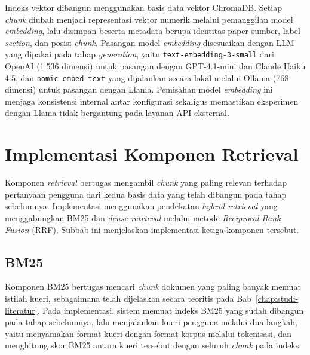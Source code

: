 Indeks vektor dibangun menggunakan basis data vektor ChromaDB. Setiap \textit{chunk} diubah menjadi representasi vektor numerik melalui pemanggilan model \textit{embedding}, lalu disimpan beserta metadata berupa identitas paper sumber, label \textit{section}, dan posisi \textit{chunk}. Pasangan model \textit{embedding} disesuaikan dengan LLM yang dipakai pada tahap \textit{generation}, yaitu \texttt{text-embedding-3-small} dari OpenAI (1.536 dimensi) untuk pasangan dengan GPT-4.1-mini dan Claude Haiku 4.5, dan \texttt{nomic-embed-text} yang dijalankan secara lokal melalui Ollama (768 dimensi) untuk pasangan dengan Llama. Pemisahan model \textit{embedding} ini menjaga konsistensi internal antar konfigurasi sekaligus memastikan eksperimen dengan Llama tidak bergantung pada layanan API eksternal.


\section{Implementasi Komponen Retrieval}
\label{sec:impl-retrieval}

Komponen \textit{retrieval} bertugas mengambil \textit{chunk} yang paling relevan terhadap pertanyaan pengguna dari kedua basis data yang telah dibangun pada tahap sebelumnya. Implementasi menggunakan pendekatan \textit{hybrid retrieval} yang menggabungkan BM25 dan \textit{dense retrieval} melalui metode \textit{Reciprocal Rank Fusion} (RRF). Subbab ini menjelaskan implementasi ketiga komponen tersebut.

\subsection{BM25}
\label{subsec:impl-bm25}

Komponen BM25 bertugas mencari \textit{chunk} dokumen yang paling banyak memuat istilah kueri, sebagaimana telah dijelaskan secara teoritis pada Bab~\ref{chap:studi-literatur}. Pada implementasi, sistem memuat indeks BM25 yang sudah dibangun pada tahap sebelumnya, lalu menjalankan kueri pengguna melalui dua langkah, yaitu menyamakan format kueri dengan format korpus melalui tokenisasi, dan menghitung skor BM25 antara kueri tersebut dengan seluruh \textit{chunk} pada indeks.

